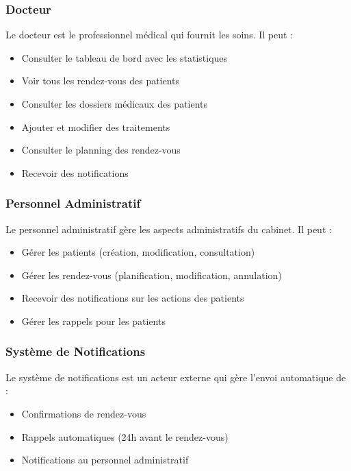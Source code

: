 \documentclass[12pt,a4paper]{report}
\begin{document}
\subsubsection{Docteur}

Le docteur est le professionnel médical qui fournit les soins. Il peut :
\begin{itemize}
    \item Consulter le tableau de bord avec les statistiques
    \item Voir tous les rendez-vous des patients
    \item Consulter les dossiers médicaux des patients
    \item Ajouter et modifier des traitements
    \item Consulter le planning des rendez-vous
    \item Recevoir des notifications
\end{itemize}

\subsubsection{Personnel Administratif}

Le personnel administratif gère les aspects administratifs du cabinet. Il peut :
\begin{itemize}
    \item Gérer les patients (création, modification, consultation)
    \item Gérer les rendez-vous (planification, modification, annulation)
    \item Recevoir des notifications sur les actions des patients
    \item Gérer les rappels pour les patients
\end{itemize}

\subsubsection{Système de Notifications}

Le système de notifications est un acteur externe qui gère l'envoi automatique de :
\begin{itemize}
    \item Confirmations de rendez-vous
    \item Rappels automatiques (24h avant le rendez-vous)
    \item Notifications au personnel administratif
\end{itemize}
\end{document}
